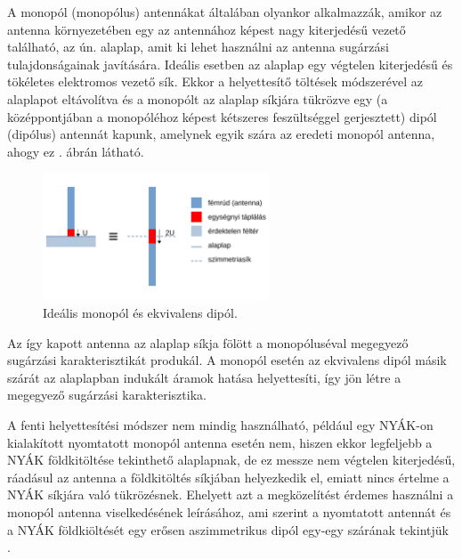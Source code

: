 \par A monopól (monopólus) antennákat általában olyankor alkalmazzák, amikor az antenna környezetében egy az antennához képest nagy kiterjedésű vezető található, az ún. alaplap, amit ki lehet használni az antenna sugárzási tulajdonságainak javítására. Ideális esetben az alaplap egy végtelen kiterjedésű és tökéletes elektromos vezető sík. Ekkor a helyettesítő töltések módszerével \cite{fodor} az alaplapot eltávolítva és a monopólt az alaplap síkjára tükrözve egy (a középpontjában a monopóléhoz képest kétszeres feszültséggel gerjesztett) dipól (dipólus) antennát kapunk, amelynek egyik szára az eredeti monopól antenna, ahogy ez . ábrán látható.
\begin{figure}[h]
	\centering
	\includegraphics[width=0.6\textwidth]{kep/monopol.pdf}
	\caption{Ideális monopól és ekvivalens dipól.}
	\label{fig:monopol}
\end{figure}
\par Az így kapott antenna az alaplap síkja fölött a monopóluséval megegyező sugárzási karakterisztikát produkál. A monopól esetén az ekvivalens dipól másik szárát az alaplapban indukált áramok hatása helyettesíti, így jön létre a megegyező sugárzási karakterisztika.
\par A fenti helyettesítési módszer nem mindig használható, például egy NYÁK-on kialakított nyomtatott monopól antenna esetén nem, hiszen ekkor legfeljebb a NYÁK földkitöltése tekinthető alaplapnak, de ez messze nem végtelen kiterjedésű, ráadásul az antenna a földkitöltés síkjában helyezkedik el, emiatt nincs értelme a NYÁK síkjára való tükrözésnek. Ehelyett azt a megközelítést érdemes használni a monopól antenna viselkedésének leírásához, ami szerint a nyomtatott antennát és a NYÁK földkiöltését egy erősen aszimmetrikus dipól egy-egy szárának tekintjük \cite{multi-band}.
